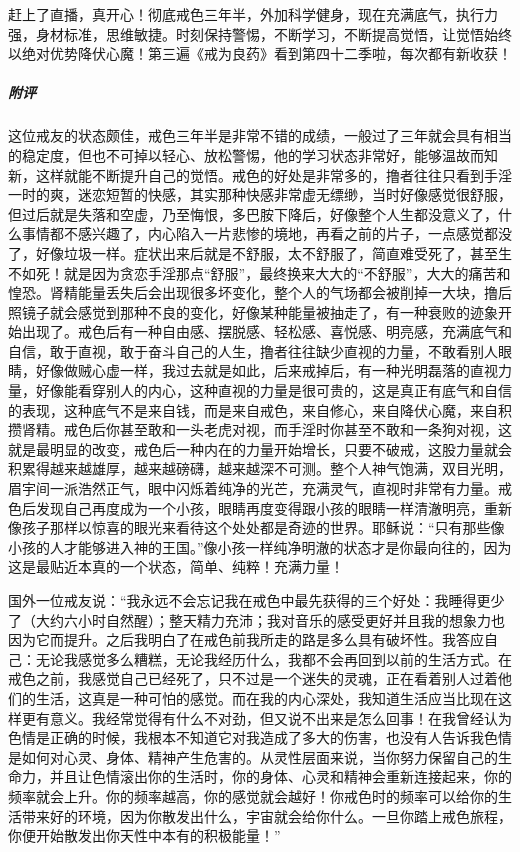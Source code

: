 \begin{case}
    赶上了直播，真开心！彻底戒色三年半，外加科学健身，现在充满底气，执行力强，身材标准，思维敏捷。时刻保持警惕，不断学习，不断提高觉悟，让觉悟始终以绝对优势降伏心魔！第三遍《戒为良药》看到第四十二季啦，每次都有新收获！
    \subparagraph{附评} 这位戒友的状态颇佳，戒色三年半是非常不错的成绩，一般过了三年就会具有相当的稳定度，但也不可掉以轻心、放松警惕，他的学习状态非常好，能够温故而知新，这样就能不断提升自己的觉悟。戒色的好处是非常多的，撸者往往只看到手淫一时的爽，迷恋短暂的快感，其实那种快感非常虚无缥缈，当时好像感觉很舒服，但过后就是失落和空虚，乃至悔恨，多巴胺下降后，好像整个人生都没意义了，什么事情都不感兴趣了，内心陷入一片悲惨的境地，再看之前的片子，一点感觉都没了，好像垃圾一样。症状出来后就是不舒服，太不舒服了，简直难受死了，甚至生不如死！就是因为贪恋手淫那点“舒服”，最终换来大大的“不舒服”，大大的痛苦和惶恐。肾精能量丢失后会出现很多坏变化，整个人的气场都会被削掉一大块，撸后照镜子就会感觉到那种不良的变化，好像某种能量被抽走了，有一种衰败的迹象开始出现了。戒色后有一种自由感、摆脱感、轻松感、喜悦感、明亮感，充满底气和自信，敢于直视，敢于奋斗自己的人生，撸者往往缺少直视的力量，不敢看别人眼睛，好像做贼心虚一样，我过去就是如此，后来戒掉后，有一种光明磊落的直视力量，好像能看穿别人的内心，这种直视的力量是很可贵的，这是真正有底气和自信的表现，这种底气不是来自钱，而是来自戒色，来自修心，来自降伏心魔，来自积攒肾精。戒色后你甚至敢和一头老虎对视，而手淫时你甚至不敢和一条狗对视，这就是最明显的改变，戒色后一种内在的力量开始增长，只要不破戒，这股力量就会积累得越来越雄厚，越来越磅礴，越来越深不可测。整个人神气饱满，双目光明，眉宇间一派浩然正气，眼中闪烁着纯净的光芒，充满灵气，直视时非常有力量。戒色后发现自己再度成为一个小孩，眼睛再度变得跟小孩的眼睛一样清澈明亮，重新像孩子那样以惊喜的眼光来看待这个处处都是奇迹的世界。耶稣说：“只有那些像小孩的人才能够进入神的王国。”像小孩一样纯净明澈的状态才是你最向往的，因为这是最贴近本真的一个状态，简单、纯粹！充满力量！

    国外一位戒友说：“我永远不会忘记我在戒色中最先获得的三个好处：我睡得更少了（大约六小时自然醒）；整天精力充沛；我对音乐的感受更好并且我的想象力也因为它而提升。之后我明白了在戒色前我所走的路是多么具有破坏性。我答应自己：无论我感觉多么糟糕，无论我经历什么，我都不会再回到以前的生活方式。在戒色之前，我感觉自己已经死了，只不过是一个迷失的灵魂，正在看着别人过着他们的生活，这真是一种可怕的感觉。而在我的内心深处，我知道生活应当比现在这样更有意义。我经常觉得有什么不对劲，但又说不出来是怎么回事！在我曾经认为色情是正确的时候，我根本不知道它对我造成了多大的伤害，也没有人告诉我色情是如何对心灵、身体、精神产生危害的。从灵性层面来说，当你努力保留自己的生命力，并且让色情滚出你的生活时，你的身体、心灵和精神会重新连接起来，你的频率就会上升。你的频率越高，你的感觉就会越好！你戒色时的频率可以给你的生活带来好的环境，因为你散发出什么，宇宙就会给你什么。一旦你踏上戒色旅程，你便开始散发出你天性中本有的积极能量！”


\end{case}
